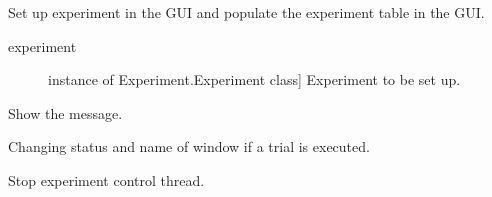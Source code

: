 \documentclass[letterpaper,10pt,english]{sphinxmanual}
\begin{document}
\begin{fulllineitems}
\begin{fulllineitems}
\end{fulllineitems}


\begin{fulllineitems}
\label{\detokenize{NoSeMazeControl/main:main.MainApp.setup_experiment_bindings}}
\pysigstartsignatures
{}
\pysigstopsignatures
\sphinxAtStartPar
Set up experiment in the GUI and populate the experiment table in the GUI.
\begin{description}
\item[{experiment}] \leavevmode{[}instance of Experiment.Experiment class{]}
\sphinxAtStartPar
Experiment to be set up.

\end{description}

\end{fulllineitems}


\begin{fulllineitems}
\label{\detokenize{NoSeMazeControl/main:main.MainApp.show_about}}
\pysigstartsignatures
{}
\pysigstopsignatures
\sphinxAtStartPar
Show the  message.

\end{fulllineitems}


\begin{fulllineitems}
\label{\detokenize{NoSeMazeControl/main:main.MainApp.status_changed}}
\pysigstartsignatures
{}
\pysigstopsignatures
\sphinxAtStartPar
Changing status and name of window if a trial is executed.

\end{fulllineitems}


\begin{fulllineitems}
\label{\detokenize{NoSeMazeControl/main:main.MainApp.thread_control}}
\pysigstartsignatures
{}
\pysigstopsignatures
\sphinxAtStartPar
Stop experiment control thread.


\end{fulllineitems}
\end{fulllineitems}
\end{document}
